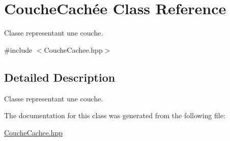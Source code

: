 \hypertarget{class_couche_cach_xC3_xA9e}{}\section{Couche\+Cachée Class Reference}
\label{class_couche_cach_xC3_xA9e}


Classe representant une couche.  




{\ttfamily \#include $<$Couche\+Cachee.\+hpp$>$}



\subsection{Detailed Description}
Classe representant une couche. 

The documentation for this class was generated from the following file\+:\begin{DoxyCompactItemize}
\item 
\hyperlink{_couche_cachee_8hpp}{Couche\+Cachee.\+hpp}\end{DoxyCompactItemize}
